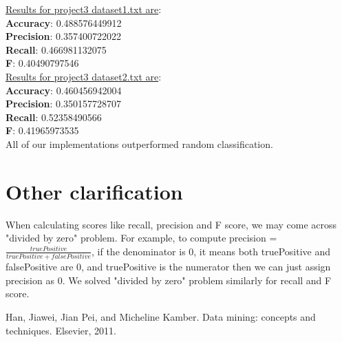 \documentclass[paper=letter, fontsize=11pt]{article}
\numberwithin{equation}{section}		%
\numberwithin{figure}{section}			%
\numberwithin{table}{section}				%
\begin{document}
\noindent \underline{Results for project3 dataset1.txt are}: \\ 
\textbf{Accuracy}: 0.488576449912\\
\textbf{Precision}: 0.357400722022\\
\textbf{Recall}: 0.466981132075\\
\textbf{F}: 0.40490797546\\

\noindent \underline{Results for project3 dataset2.txt are}:\\
\textbf{Accuracy}: 0.460456942004\\
\textbf{Precision}: 0.350157728707\\
\textbf{Recall}: 0.52358490566\\
\textbf{F}: 0.41965973535\\

All of our implementations outperformed random classification. 


\section{Other clarification}
When calculating scores like recall, precision and F score, we may come across "divided by zero" problem. For example, to compute precision = $  \frac{truePositive}{truePositive + falsePositive}$, if the denominator is 0, it means both truePositive and falsePositive are 0, and truePositive is the numerator then we can just assign precision as 0. We solved "divided by zero" problem similarly for recall and F score.
 

 \begin{thebibliography}{1}
 Han, Jiawei, Jian Pei, and Micheline Kamber. Data mining: concepts and techniques. Elsevier, 2011.
 \end{thebibliography}
\end{document}
